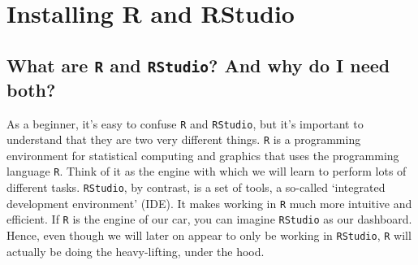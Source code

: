 \documentclass[
  letterpaper,
  DIV=11,
  numbers=noendperiod,
  oneside]{scrreprt}
\begin{document}
\section{Installing R and RStudio}\label{installing-r-and-rstudio-1}

\subsection{\texorpdfstring{What are \texttt{R} and \texttt{RStudio}?
And why do I need
both?}{What are R and RStudio? And why do I need both?}}\label{what-are-r-and-rstudio-and-why-do-i-need-both}

As a beginner, it's easy to confuse \texttt{R} and \texttt{RStudio}, but
it's important to understand that they are two very different things.
\texttt{R} is a programming environment for statistical computing and
graphics that uses the programming language \texttt{R}. Think of it as
the engine with which we will learn to perform lots of different tasks.
\texttt{RStudio}, by contrast, is a set of tools, a so-called
`integrated development environment' (IDE). It makes working in
\texttt{R} much more intuitive and efficient. If \texttt{R} is the
engine of our car, you can imagine \texttt{RStudio} as our dashboard.
Hence, even though we will later on appear to only be working in
\texttt{RStudio}, \texttt{R} will actually be doing the heavy-lifting,
under the hood.
\end{document}
